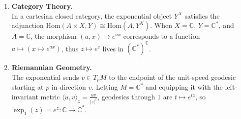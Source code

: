 {\begin{enumerate}
    An exponential is a group homomorphism \( \phi \colon A \to M^\times \) such that \( \phi(x + y) = \phi(x)\phi(y) \). If we let \( A = \mathbb{C} \) and \( M^\times = \mathbb{C}^* \), all such homomorphisms are \( \phi(z) = e^{\lambda z} \) for some \( \lambda \in \mathbb{C} \), and choosing \( \lambda = 1 \) gives the classical exponential \( e^z \colon \mathbb{C} \to \mathbb{C}^* \).
    \\
    \item \textbf{Category Theory.}  \\
    In a cartesian closed category, the exponential object \( Y^X \) satisfies the adjunction \( \mathrm{Hom}(A \times X, Y) \cong \mathrm{Hom}(A, Y^X) \). When \( X = \mathbb{C} \), \( Y = \mathbb{C}^* \), and \( A = \mathbb{C} \), the morphism \( (a, x) \mapsto e^{a x} \) corresponds to a function \( a \mapsto (x \mapsto e^{a x}) \), thus \( z \mapsto e^z \) lives in \( (\mathbb{C}^*)^{\mathbb{C}} \).
    \\
    \item \textbf{Riemannian Geometry.}  \\
    The exponential sends \( v \in T_p M \) to the endpoint of the unit-speed geodesic starting at \( p \) in direction \( v \). Letting \( M = \mathbb{C}^* \) and equipping it with the left-invariant metric \( \langle u, v \rangle_z = \frac{uv}{|z|^2} \), geodesics through \( 1 \) are \( t \mapsto e^{t z} \), so \( \exp_1(z) = e^z \colon \mathbb{C} \to \mathbb{C}^* \).

\end{enumerate}
}
